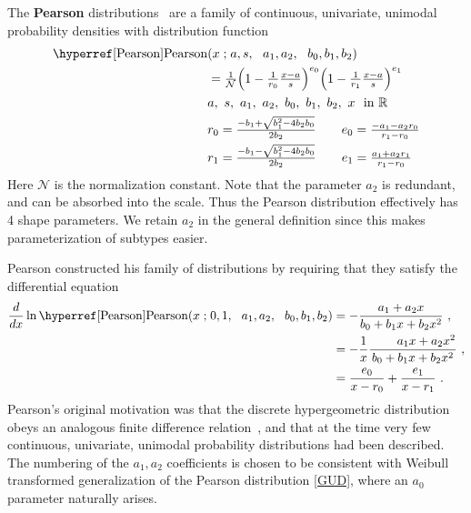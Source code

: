 

\label{sec:Pearson}
{} 
The {\bf Pearson} distributions~\cite{Pearson1895, Pearson1901, Pearson1916, Ord1972, Johnson1994} are a family of continuous, univariate, unimodal probability densities with distribution function
\begin{align}
\label{Pearson}
 \opr{Pearson}&(x\given a, s\sep a_1, a_2\sep  b_0, b_1, b_2) 
 \\ \notag
 &=  \tfrac{1}{\mathcal{N}} \Left(1- \tfrac{1}{r_0}\tfrac{x-a}{s} \Right)^{e_0} \Left(1- \tfrac{1}{r_1}\tfrac{x-a}{s} \Right)^{e_1}
\\ \notag
&  a,\ s,\  a_1,\ a_2,\ b_0,\ b_1,\ b_2,\ x\  \text{ in } \mathbb{R}
\\ \notag
& r_0 = \tfrac{-b_1+\sqrt{b_1^2 - 4b_2b_0} }{2b_2} \checked  \qquad e_0 = \tfrac{-a_1-a_2 r_0}{r_1-r_0} \\
\notag
& r_1 = \tfrac{-b_1-\sqrt{b_1^2 - 4b_2b_0} }{2b_2} \checked \qquad e_1 = \tfrac{a_1+a_2 r_1}{r_1-r_0} 
\end{align}
Here $\mathcal{N}$ is the normalization constant. Note that the parameter $a_2$  is redundant, and can be absorbed into the scale. Thus the Pearson distribution effectively has 4 shape parameters. We retain $a_2$ in the general definition since this makes parameterization of subtypes easier. 


Pearson constructed his family of distributions by requiring that they satisfy the differential equation
\begin{align*}
\frac{d}{dx} \ln  \opr{Pearson}(x\given 0, 1\sep a_1, a_2\sep b_0, b_1, b_2) 
&= - \frac{a_1 + a_2 x  }{b_0+ b_1 x+ b_2 x^2  } \ ,  \checked \\
&= - \frac{1}{x} \frac{\phantom{a_0 + {} } a_1 x + a_2 x^2  }{b_0+ b_1 x+ b_2 x^2  } \ ,  \checked \\
&= \frac{e_0}{x-r_0} + \frac{e_1}{x-r_1} \ . \checked
\end{align*}
Pearson's original motivation was that the discrete hypergeometric distribution obeys an analogous finite difference relation~\cite{Ord1972}, and that at the time very few continuous, univariate, unimodal probability distributions had been described. The numbering of the $a_1, a_2$ coefficients is chosen to be consistent with Weibull transformed generalization of the Pearson distribution \eqref{GUD}, where an $a_0$ parameter naturally arises. 



